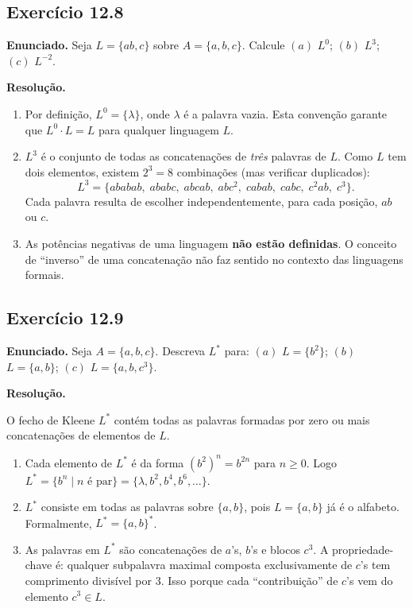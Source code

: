 \documentclass[12pt,a4paper]{article}
\begin{document}
\subsection*{Exercício 12.8}

\textbf{Enunciado.} Seja $L = \{ab, c\}$ sobre $A = \{a,b,c\}$. Calcule
$(a)$ $L^0$;\; $(b)$ $L^3$;\; $(c)$ $L^{-2}$.

\medskip
\textbf{Resolução.}

\begin{enumerate}[label=(\alph*)]
  \item Por definição, $L^0 = \{\lambda\}$, onde $\lambda$ é a palavra vazia.
        Esta convenção garante que $L^0 \cdot L = L$ para qualquer linguagem $L$.

  \item $L^3$ é o conjunto de todas as concatenações de \emph{três} palavras de $L$.
        Como $L$ tem dois elementos, existem $2^3 = 8$ combinações (mas verificar
        duplicados):
        \[
          L^3 = \{ababab,\; ababc,\; abcab,\; abc^2,\; cabab,\; cabc,\; c^2ab,\; c^3\}.
        \]
        Cada palavra resulta de escolher independentemente, para cada posição, $ab$ ou $c$.

  \item As potências negativas de uma linguagem \textbf{não estão definidas}.
        O conceito de ``inverso'' de uma concatenação não faz sentido no contexto das
        linguagens formais.
\end{enumerate}

\subsection*{Exercício 12.9}

\textbf{Enunciado.} Seja $A = \{a,b,c\}$. Descreva $L^*$ para:
$(a)$ $L = \{b^2\}$;\; $(b)$ $L = \{a,b\}$;\; $(c)$ $L = \{a,b,c^3\}$.

\medskip
\textbf{Resolução.}

O fecho de Kleene $L^*$ contém todas as palavras formadas por zero ou mais concatenações
de elementos de $L$.

\begin{enumerate}[label=(\alph*)]
  \item Cada elemento de $L^*$ é da forma $(b^2)^n = b^{2n}$ para $n \ge 0$.
        Logo $L^* = \{b^n \mid n \text{ é par}\} = \{\lambda, b^2, b^4, b^6, \ldots\}$.

  \item $L^*$ consiste em todas as palavras sobre $\{a,b\}$, pois $L = \{a,b\}$
        já é o alfabeto. Formalmente, $L^* = \{a,b\}^*$.

  \item As palavras em $L^*$ são concatenações de $a$'s, $b$'s e blocos $c^3$.
        A propriedade-chave é: qualquer subpalavra maximal composta exclusivamente de
        $c$'s tem comprimento divisível por 3. Isso porque cada ``contribuição'' de $c$'s
        vem do elemento $c^3 \in L$.
\end{enumerate}
\end{document}

